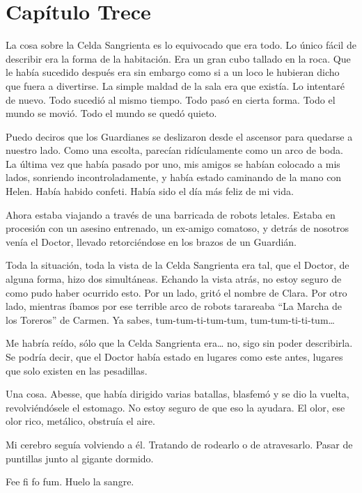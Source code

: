 \chapter*{Capítulo Trece}

La cosa sobre la Celda Sangrienta es lo equivocado que era todo. Lo
único fácil de describir era la forma de la habitación. Era un gran cubo
tallado en la roca. Que le había sucedido después era sin embargo como
si a un loco le hubieran dicho que fuera a divertirse. La simple maldad
de la sala era que existía. Lo intentaré de nuevo. Todo sucedió al mismo
tiempo. Todo pasó en cierta forma. Todo el mundo se movió. Todo el mundo
se quedó quieto.

Puedo deciros que los Guardianes se deslizaron desde el ascensor para
quedarse a nuestro lado. Como una escolta, parecían ridículamente como
un arco de boda. La última vez que había pasado por uno, mis amigos se
habían colocado a mis lados, sonriendo incontroladamente, y había estado
caminando de la mano con Helen. Había habido confeti. Había sido el día
más feliz de mi vida.

Ahora estaba viajando a través de una barricada de robots letales.
Estaba en procesión con un asesino entrenado, un ex-amigo comatoso, y
detrás de nosotros venía el Doctor, llevado retorciéndose en los brazos
de un Guardián.

Toda la situación, toda la vista de la Celda Sangrienta era tal, que el
Doctor, de alguna forma, hizo dos simultáneas. Echando la vista atrás,
no estoy seguro de como pudo haber ocurrido esto. Por un lado, gritó el
nombre de Clara. Por otro lado, mientras íbamos por ese terrible arco de
robots tarareaba ``La Marcha de los Toreros'' de Carmen. Ya sabes,
tum-tum-ti-tum-tum, tum-tum-ti-ti-tum\ldots{}

Me habría reído, sólo que la Celda Sangrienta era\ldots{} no, sigo sin
poder describirla. Se podría decir, que el Doctor había estado en
lugares como este antes, lugares que solo existen en las pesadillas.

Una cosa. Abesse, que había dirigido varias batallas, blasfemó y se dio
la vuelta, revolviéndósele el estomago. No estoy seguro de que eso la
ayudara. El olor, ese olor rico, metálico, obstruía el aire.

Mi cerebro seguía volviendo a él. Tratando de rodearlo o de atravesarlo.
Pasar de puntillas junto al gigante dormido.

Fee fi fo fum. Huelo la sangre.

